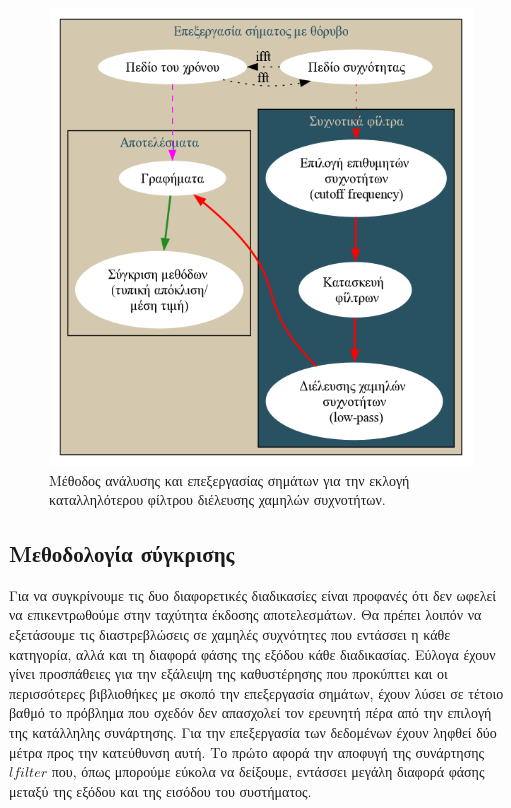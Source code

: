 \documentclass[breaklines=true, 12pt]{article}
\begin{document}
{{{\begin{figure}[htbp]
\centering
\includegraphics[width=.9\linewidth]{./flowcharts/proc-meth.png}
\caption{Μέθοδος ανάλυσης και επεξεργασίας σημάτων για την εκλογή καταλληλότερου φίλτρου διέλευσης χαμηλών συχνοτήτων.}
\end{figure}

\clearpage
\subsection{Μεθοδολογία σύγκρισης}
\label{sec:orgb15d17b}
Για να συγκρίνουμε τις δυο διαφορετικές διαδικασίες είναι προφανές ότι δεν
ωφελεί να επικεντρωθούμε στην ταχύτητα έκδοσης αποτελεσμάτων. Θα πρέπει λοιπόν
να εξετάσουμε τις διαστρεβλώσεις σε χαμηλές συχνότητες που εντάσσει η κάθε
κατηγορία, αλλά και τη διαφορά φάσης της εξόδου κάθε διαδικασίας. Εύλογα έχουν
γίνει προσπάθειες για την εξάλειψη της καθυστέρησης που προκύπτει και οι
περισσότερες βιβλιοθήκες με σκοπό την επεξεργασία σημάτων, έχουν λύσει σε
τέτοιο βαθμό το πρόβλημα που σχεδόν δεν απασχολεί τον ερευνητή πέρα από την
επιλογή της κατάλληλης συνάρτησης. Για την επεξεργασία των δεδομένων έχουν ληφθεί
δύο μέτρα προς την κατεύθυνση αυτή. Το πρώτο αφορά την αποφυγή της συνάρτησης
\(lfilter\) που, όπως μπορούμε εύκολα να δείξουμε, εντάσσει μεγάλη διαφορά φάσης
μεταξύ της εξόδου και της εισόδου του συστήματος.

}}}
\end{document}

